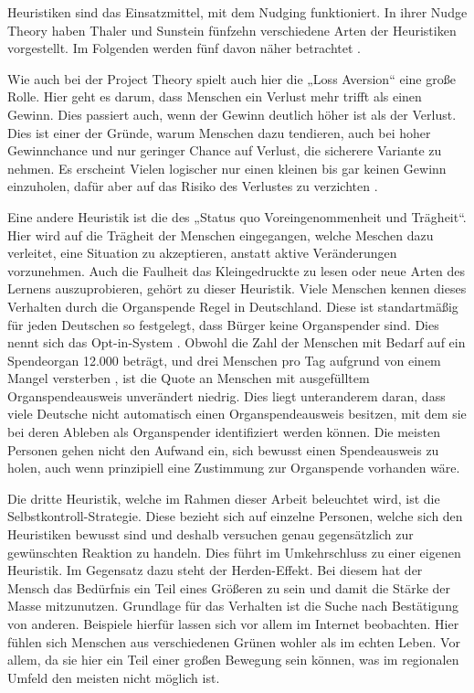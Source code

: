 Heuristiken sind das Einsatzmittel, mit dem Nudging funktioniert. In ihrer Nudge Theory haben Thaler und Sunstein fünfzehn verschiedene Arten der Heuristiken vorgestellt. Im Folgenden werden fünf davon näher betrachtet \parencite{Businessballs.2013}.

Wie auch bei der Project Theory spielt auch hier die „Loss Aversion“ eine große Rolle. Hier geht es darum, dass Menschen ein Verlust mehr trifft als einen Gewinn. Dies passiert auch, wenn der Gewinn deutlich höher ist als der Verlust. Dies ist einer der Gründe, warum Menschen dazu tendieren, auch bei hoher Gewinnchance und nur geringer Chance auf Verlust, die sicherere Variante zu nehmen. Es erscheint Vielen logischer nur einen kleinen  bis gar keinen Gewinn einzuholen, dafür aber auf das Risiko des Verlustes zu verzichten \parencite[]{Thaler.2021}.

Eine andere Heuristik ist die des „Status quo Voreingenommenheit und Trägheit“. Hier wird auf die Trägheit der Menschen eingegangen, welche Meschen dazu verleitet,  eine Situation zu akzeptieren, anstatt aktive Veränderungen vorzunehmen. Auch die Faulheit das Kleingedruckte zu lesen oder neue Arten des Lernens auszuprobieren, gehört zu dieser Heuristik. Viele Menschen kennen dieses Verhalten durch die Organspende Regel in Deutschland. Diese ist standartmäßig für jeden Deutschen so festgelegt, dass Bürger keine Organspender sind. Dies nennt sich das Opt-in-System \parencite{ApothekeAdhoc.2017}. Obwohl die Zahl der Menschen mit Bedarf auf ein Spendeorgan 12.000 beträgt, und drei Menschen pro Tag aufgrund von einem Mangel versterben \parencite{ApothekeAdhoc.2011}, ist die Quote an Menschen mit ausgefülltem Organspendeausweis unverändert niedrig. Dies liegt unteranderem daran, dass viele Deutsche nicht automatisch einen Organspendeausweis besitzen, mit dem sie bei deren Ableben als Organspender identifiziert werden können. Die meisten Personen gehen nicht den Aufwand ein, sich bewusst einen Spendeausweis zu holen, auch wenn prinzipiell eine Zustimmung zur Organspende vorhanden wäre. 

Die dritte Heuristik, welche im Rahmen dieser Arbeit beleuchtet wird, ist die Selbstkontroll-Strategie. Diese bezieht sich auf einzelne Personen, welche sich den Heuristiken bewusst sind und deshalb versuchen genau gegensätzlich zur gewünschten Reaktion zu handeln. Dies führt im Umkehrschluss zu einer eigenen Heuristik.
Im Gegensatz dazu steht der Herden-Effekt. Bei diesem hat der Mensch das Bedürfnis ein Teil eines Größeren zu sein und damit die Stärke der Masse mitzunutzen. Grundlage für das Verhalten ist die Suche nach Bestätigung von anderen. Beispiele hierfür lassen sich vor allem im Internet beobachten. Hier fühlen sich Menschen aus verschiedenen Grünen wohler als im echten Leben. Vor allem, da sie hier ein Teil einer großen Bewegung sein können, was im regionalen Umfeld den meisten nicht möglich ist.

